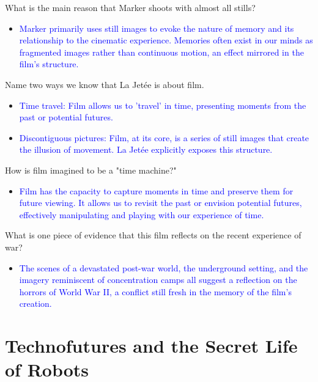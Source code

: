 \documentclass[11pt,fleqn]{book} %
\begin{document}
\begin{exercise}
What is the main reason that Marker shoots with almost all stills?
\begin{itemize}
\item \textcolor{blue}{Marker primarily uses still images to evoke the nature of memory and its relationship to the cinematic experience. Memories often exist in our minds as fragmented images rather than continuous motion, an effect mirrored in the film's structure.}
\end{itemize}
\end{exercise}

\begin{exercise}
Name two ways we know that La Jetée is about film.
\begin{itemize}
\item \textcolor{blue}{Time travel: Film allows us to 'travel' in time, presenting moments from the past or potential futures.}
\item \textcolor{blue}{Discontiguous pictures: Film, at its core, is a series of still images that create the illusion of movement. La Jetée explicitly exposes this structure.}
\end{itemize}
\end{exercise}

\begin{exercise}
How is film imagined to be a "time machine?"
\begin{itemize}
\item \textcolor{blue}{ Film has the capacity to capture moments in time and preserve them for future viewing. It allows us to revisit the past or envision potential futures, effectively manipulating and playing with our experience of time.}
\end{itemize}
\end{exercise}

\begin{exercise}
What is one piece of evidence that this film reflects on the recent experience of war?
\begin{itemize}
\item \textcolor{blue}{The scenes of a devastated post-war world, the underground setting, and the imagery reminiscent of concentration camps all suggest a reflection on the horrors of World War II, a conflict still fresh in the memory of the film's creation.}
\end{itemize}
\end{exercise}


\section{Technofutures and the Secret Life of Robots}
\end{document}
